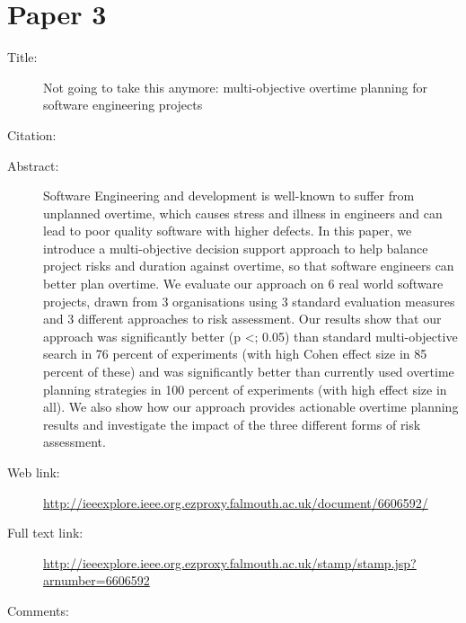 \documentclass{scrartcl}
\begin{document}
\section*{Paper 3}
\begin{description}
\item[Title:]Not going to take this anymore: multi-objective overtime planning for software engineering projects
\item[Citation:] \cite{ferrucci2013not}
\item[Abstract:] Software Engineering and development is well-known to suffer from unplanned overtime, which causes stress and illness in engineers and can lead to poor quality software with higher defects. In this paper, we introduce a multi-objective decision support approach to help balance project risks and duration against overtime, so that software engineers can better plan overtime. We evaluate our approach on 6 real world software projects, drawn from 3 organisations using 3 standard evaluation measures and 3 different approaches to risk assessment. Our results show that our approach was significantly better (p <; 0.05) than standard multi-objective search in 76 percent of experiments (with high Cohen effect size in 85 percent of these) and was significantly better than currently used overtime planning strategies in 100 percent of experiments (with high effect size in all). We also show how our approach provides actionable overtime planning results and investigate the impact of the three different forms of risk assessment.
\item[Web link:] \url{ http://ieeexplore.ieee.org.ezproxy.falmouth.ac.uk/document/6606592/}
\item[Full text link:]\url{ http://ieeexplore.ieee.org.ezproxy.falmouth.ac.uk/stamp/stamp.jsp?arnumber=6606592}
\item[Comments:] 
\end{description}
\end{document}
